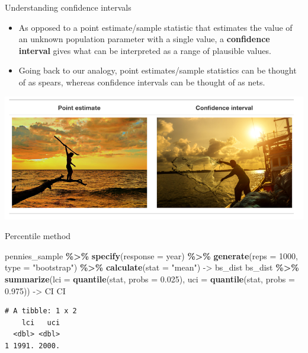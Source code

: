 \documentclass[
  ignorenonframetext,
]{beamer}
\newenvironment{Shaded}{\begin{snugshade}}{\end{snugshade}}
\newcommand{\AttributeTok}[1]{\textcolor[rgb]{0.13,0.29,0.53}{#1}}
\newcommand{\DecValTok}[1]{\textcolor[rgb]{0.00,0.00,0.81}{#1}}
\newcommand{\FloatTok}[1]{\textcolor[rgb]{0.00,0.00,0.81}{#1}}
\newcommand{\FunctionTok}[1]{\textcolor[rgb]{0.13,0.29,0.53}{\textbf{#1}}}
\newcommand{\NormalTok}[1]{#1}
\newcommand{\OtherTok}[1]{\textcolor[rgb]{0.56,0.35,0.01}{#1}}
\newcommand{\SpecialCharTok}[1]{\textcolor[rgb]{0.81,0.36,0.00}{\textbf{#1}}}
\newcommand{\StringTok}[1]{\textcolor[rgb]{0.31,0.60,0.02}{#1}}
\begin{document}
\begin{frame}{Understanding confidence intervals}
\protect\hypertarget{understanding-confidence-intervals-3}{}
\begin{itemize}
\item
  As opposed to a point estimate/sample statistic that estimates the
  value of an unknown population parameter with a single value, a
  \textbf{confidence interval} gives what can be interpreted as a range
  of plausible values.
\item
  Going back to our analogy, point estimates/sample statistics can be
  thought of as spears, whereas confidence intervals can be thought of
  as nets.
\end{itemize}

\begin{center}\includegraphics[width=0.7\linewidth,height=0.4\textheight]{week10_7} \end{center}
\end{frame}

\begin{frame}[fragile]{Percentile method}
\protect\hypertarget{percentile-method}{}
\small

\begin{Shaded}
\begin{Highlighting}[]
\NormalTok{pennies\_sample }\SpecialCharTok{\%\textgreater{}\%} 
  \FunctionTok{specify}\NormalTok{(}\AttributeTok{response =}\NormalTok{ year) }\SpecialCharTok{\%\textgreater{}\%} 
  \FunctionTok{generate}\NormalTok{(}\AttributeTok{reps =} \DecValTok{1000}\NormalTok{, }\AttributeTok{type =} \StringTok{"bootstrap"}\NormalTok{) }\SpecialCharTok{\%\textgreater{}\%} 
  \FunctionTok{calculate}\NormalTok{(}\AttributeTok{stat =} \StringTok{"mean"}\NormalTok{) }\OtherTok{{-}\textgreater{}}\NormalTok{ bs\_dist}
\NormalTok{bs\_dist }\SpecialCharTok{\%\textgreater{}\%} 
  \FunctionTok{summarize}\NormalTok{(}\AttributeTok{lci =} \FunctionTok{quantile}\NormalTok{(stat, }\AttributeTok{probs =} \FloatTok{0.025}\NormalTok{), }
            \AttributeTok{uci =} \FunctionTok{quantile}\NormalTok{(stat, }\AttributeTok{probs =} \FloatTok{0.975}\NormalTok{)) }\OtherTok{{-}\textgreater{}}\NormalTok{ CI}
\NormalTok{CI}
\end{Highlighting}
\end{Shaded}

\begin{verbatim}
# A tibble: 1 x 2
    lci   uci
  <dbl> <dbl>
1 1991. 2000.
\end{verbatim}

\normalsize
\end{frame}
\end{document}
